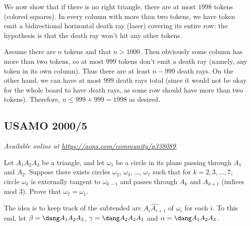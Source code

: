 \documentclass[11pt]{scrartcl}
\begin{document}
We now show that if there is no right triangle,
there are at most $1998$ tokens (colored squares).
In every column with more than two tokens,
we have token emit a bidirectional horizontal
death ray (laser) covering its entire row:
the hypothesis is that the death ray won't hit any other tokens.
\begin{center}
\end{center}

Assume there are $n$ tokens and that $n > 1000$.
Then obviously some column has more than two tokens,
so at most $999$ tokens don't emit a death ray
(namely, any token in its own column).
Thus there are at least $n-999$ death rays.
On the other hand, we can have at most $999$ death rays total
(since it would not be okay for the whole board to have death rays,
as some row should have more than two tokens).
Therefore, $n \le 999 + 999 = 1998$ as desired.
\pagebreak

\subsection{USAMO 2000/5}
\textsl{Available online at \url{https://aops.com/community/p338089}.}
\begin{mdframed}[style=mdpurplebox,frametitle={Problem statement}]
Let $A_1 A_2 A_3$ be a triangle,
and let $\omega_1$ be a circle in its plane
passing through $A_1$ and $A_2$.
Suppose there exists circles $\omega_2$, $\omega_3$, \dots, $\omega_7$
such that for $k = 2, 3, \dots, 7,$
circle $\omega_k$ is externally tangent to $\omega_{k-1}$ and passes
through $A_k$ and $A_{k+1}$ (indices mod $3$).
Prove that $\omega_7 = \omega_1$.
\end{mdframed}
The idea is to keep track of the subtended arc
$\widehat{A_i A_{i+1}}$ of $\omega_i$ for each $i$.
To this end, let $\beta = \dang A_1 A_2 A_3$,
$\gamma = \dang A_2 A_3 A_1$
and $\alpha = \dang A_1 A_2 A_3$.
\end{document}
